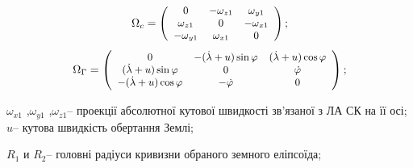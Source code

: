 \[ \small \Omega_{c} =\left(\begin{array}{ccc} 
{0} & {-\omega {}_{z1} } & {\omega {}_{y1} } \\ 
{\omega {}_{z1} } & {0} & {-\omega {}_{x1} } \\ 
{-\omega {}_{y1} } & {\omega {}_{x1}} & {0} 
\end{array}\right);\] 
\[ \small \Omega_{\Gamma } =\left(\begin{array}{ccc} 
{0} & {-(\dot{\lambda }+u)\sin \varphi } & {(\dot{\lambda }+u)\cos \varphi } \\ 
{(\dot{\lambda}+u)\sin \varphi } & {0} & {\dot{\varphi }} \\
{-(\dot{\lambda }+u)\cos \varphi } & {-\dot{\varphi }} & {0} 
\end{array}\right);\] 
\begin{ESKDexplanation}
\item $\omega_{x1}$ ,$\omega_{y1}$ ,$\omega_{z1}$-- проекції абсолютної кутової швидкості 
зв'язаної з ЛА СК на її осі; $u$-- кутова швидкість обертання Землі; 
\item $R_{1} $ и $R_{2} $-- головні радіуси кривизни обраного земного еліпсоїда;
\end{ESKDexplanation}

